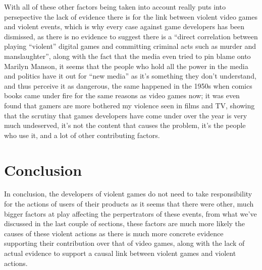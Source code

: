 \documentclass{scrartcl}
\begin{document}
 With all of these other factors being taken into account really puts into persepective the lack of evidence there is for the link between violent video games and violent events, which is why every case against game developers has been dismissed, as there is no evidence to suggest there is a ``direct correlation between playing “violent” digital games and committing criminal acts such as murder and manslaughter''\cite{thayer2007analyzing}, along with the fact that the media even tried to pin blame onto Marilyn Manson\cite{thayer2007analyzing}, it seems that the people who hold all the power in the media and politics have it out for ``new media'' as it's something they don't understand, and thus perceive it as dangerous, the same happened in the 1950s when comics books came under fire for the same reasons as video games now; it was even found that gamers are more bothered my violence seen in films and TV\cite{bbfc}, showing that the scrutiny that games developers have come under over the year is very much undeserved, it's not the content that causes the problem, it's the people who use it, and a lot of other contributing factors. 




\section{Conclusion}
In conclusion, the developers of violent games do not need to take responsibility for the actions of users of their products as it seems that there were other, much bigger factors at play affecting the perpertrators of these events, from what we've discussed in the last couple of sections, these factors are much more likely the causes of these violent actions as there is much more concrete evidence supporting their contribution over that of video games, along with the lack of actual evidence to support a causal link between violent games and violent actions.  









\end{document}
